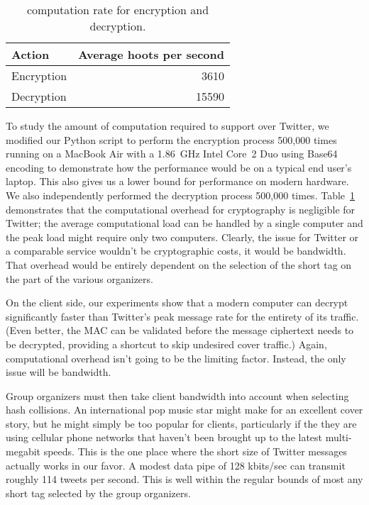 \begin{table}
\caption{\hoot computation rate for encryption and
  decryption.\label{tab:hps}}
\begin{center}
    \begin{tabular}{ l  r }
	Action & Average hoots per second \\ \hline
	Encryption & 3610 \\
	Decryption & 15590 
    \end{tabular}
\end{center}
\end{table}

To study the amount of computation required to support \hoot over
Twitter, we modified our Python script to perform the encryption process 
500,000 times running on a MacBook
Air with a 1.86~GHz Intel Core~2 Duo using Base64 encoding to demonstrate how the performance would be on a typical end user's laptop. This also gives us a lower bound for performance on modern hardware. We 
also independently performed the decryption process 500,000 times. 
Table~\ref{tab:hps} demonstrates that the computational overhead
for \hoot cryptography is negligible for Twitter; the average
computational load can be handled by a single computer and the peak
load might require only two computers. Clearly, the issue for Twitter
or a comparable service wouldn't be cryptographic costs, it would be
bandwidth. That overhead would be entirely dependent on the selection
of the short tag on the part of the various \hoot organizers. 

On the client side, our experiments show that a modern computer can
decrypt \msgs significantly faster than Twitter's peak message rate for
the entirety of its traffic. (Even better, the MAC can be validated
before the message ciphertext needs to be decrypted, providing a
shortcut to skip undesired cover traffic.)  Again, computational
overhead isn't going to be the limiting factor.  Instead, the only issue
will be bandwidth.

Group organizers must then take client bandwidth into account when
selecting hash collisions. An international pop music star might make
for an excellent cover story, but he might simply be too popular for
clients, particularly if the they are using cellular phone networks
that haven't been brought up to the latest multi-megabit speeds.
This is the one place where the short size of Twitter
messages actually works in our favor. A modest data pipe of 128
kbits/sec can transmit roughly 114 tweets per second. This is well
within the regular bounds of most any short tag selected by the group
organizers.

